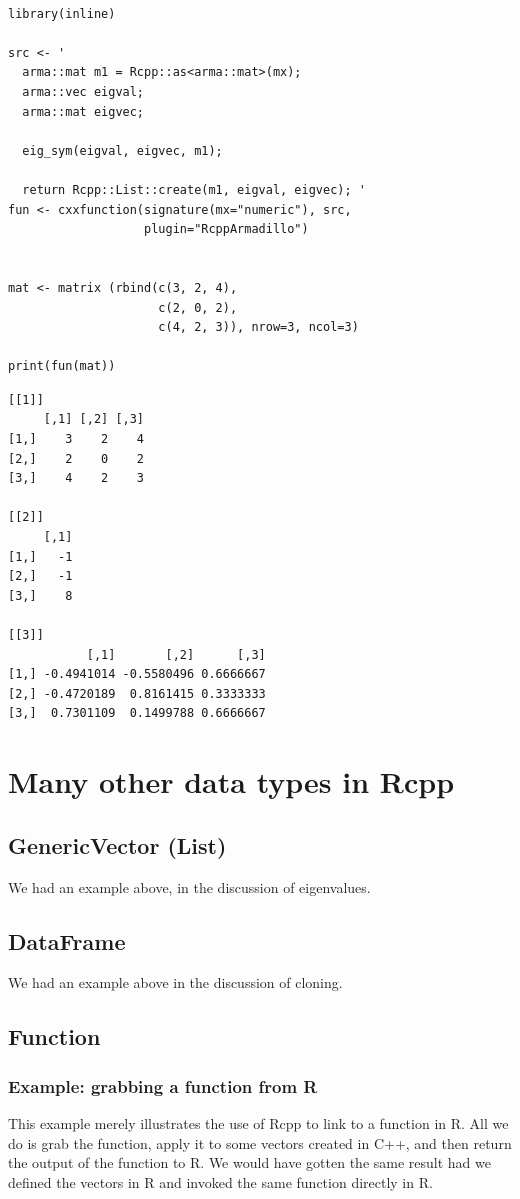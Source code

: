 \documentclass[11pt]{article}
\begin{document}
\begin{verbatim}

library(inline)

src <- '
  arma::mat m1 = Rcpp::as<arma::mat>(mx);
  arma::vec eigval;
  arma::mat eigvec;

  eig_sym(eigval, eigvec, m1);

  return Rcpp::List::create(m1, eigval, eigvec); '
fun <- cxxfunction(signature(mx="numeric"), src,
                   plugin="RcppArmadillo")


mat <- matrix (rbind(c(3, 2, 4),
                     c(2, 0, 2),
                     c(4, 2, 3)), nrow=3, ncol=3)

print(fun(mat))
\end{verbatim}


\begin{verbatim}
[[1]]
     [,1] [,2] [,3]
[1,]    3    2    4
[2,]    2    0    2
[3,]    4    2    3

[[2]]
     [,1]
[1,]   -1
[2,]   -1
[3,]    8

[[3]]
           [,1]       [,2]      [,3]
[1,] -0.4941014 -0.5580496 0.6666667
[2,] -0.4720189  0.8161415 0.3333333
[3,]  0.7301109  0.1499788 0.6666667
\end{verbatim}
\section{Many other data types in Rcpp}
\label{sec-7}
\subsection{GenericVector (List)}
\label{sec-7-1}


We had an example above, in the discussion of eigenvalues.
\subsection{DataFrame}
\label{sec-7-2}


We had an example above in the discussion of cloning.
\subsection{Function}
\label{sec-7-3}
\subsubsection{Example: grabbing a function from R}
\label{sec-7-3-1}


This example merely illustrates the use of Rcpp to link to a function
in R.  All we do is grab the function, apply it to some vectors
created in C++, and then return the output of the function to R.  We
would have gotten the same result had we defined the vectors in R and
invoked the same function directly in R.
\end{document}
